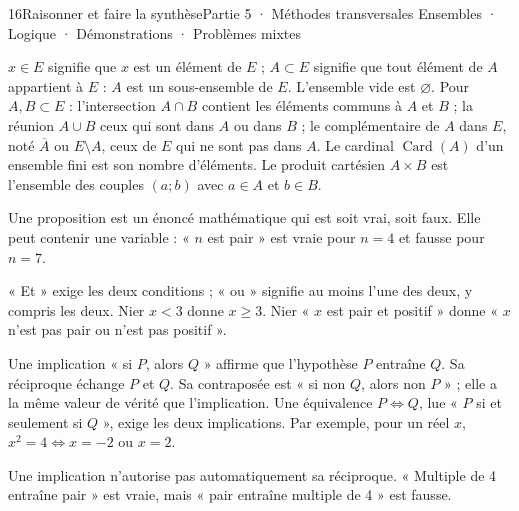 \begin{ouverture}[ensembles]{16}{Raisonner et faire la synthèse}{Partie 5 · Méthodes transversales}
{Ensembles · Logique · Démonstrations · Problèmes mixtes}
\end{ouverture}
\pagestyle{otMain}\essentiel\fontsize{11}{15}\selectfont
{}
\begin{definition}$x\in E$ signifie que $x$ est un élément de $E$ ; $A\subset E$ signifie que tout élément de $A$ appartient à $E$ : $A$ est un sous-ensemble de $E$. L’ensemble vide est $\varnothing$. Pour $A,B\subset E$ : l’intersection $A\cap B$ contient les éléments communs à $A$ et $B$ ; la réunion $A\cup B$ ceux qui sont dans $A$ ou dans $B$ ; le complémentaire de $A$ dans $E$, noté $\overline A$ ou $E\setminus A$, ceux de $E$ qui ne sont pas dans $A$. Le cardinal $\operatorname{Card}(A)$ d’un ensemble fini est son nombre d’éléments. Le produit cartésien $A\times B$ est l’ensemble des couples $(a;b)$ avec $a\in A$ et $b\in B$.\end{definition}
\begin{definition}Une proposition est un énoncé mathématique qui est soit vrai, soit faux. Elle peut contenir une variable : « $n$ est pair » est vraie pour $n=4$ et fausse pour $n=7$.\end{definition}
\begin{propriete}« Et » exige les deux conditions ; « ou » signifie au moins l’une des deux, y compris les deux. Nier $x<3$ donne $x\ge3$. Nier « $x$ est pair et positif » donne « $x$ n’est pas pair ou n’est pas positif ».\end{propriete}
\begin{definition}Une implication « si $P$, alors $Q$ » affirme que l’hypothèse $P$ entraîne $Q$. Sa réciproque échange $P$ et $Q$. Sa contraposée est « si non $Q$, alors non $P$ » ; elle a la même valeur de vérité que l’implication. Une équivalence $P\iff Q$, lue « $P$ si et seulement si $Q$ », exige les deux implications. Par exemple, pour un réel $x$, $x^2=4\iff x=-2\text{ ou }x=2$.\end{definition}
\begin{attention}Une implication n’autorise pas automatiquement sa réciproque. « Multiple de 4 entraîne pair » est vraie, mais « pair entraîne multiple de 4 » est fausse.\end{attention}
